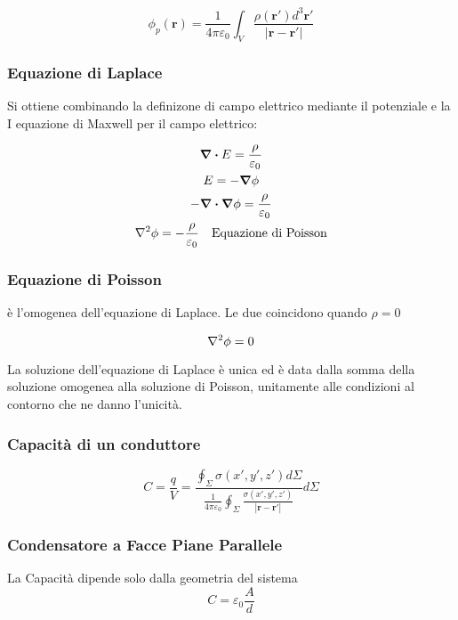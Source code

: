 \documentclass[a4paper]{scrarticle}
\begin{document}
\begin{equation}
    \phi_p(\bm r) = \frac{1}{4\pi\varepsilon_0}\int_{V}\frac{\rho(\bm r') d^3\bm r'}{\left|\bm r - \bm r'\right|}
\end{equation}


\subsubsection*{Equazione di Laplace}

Si ottiene combinando la definizone di campo elettrico mediante il potenziale e la I equazione di Maxwell per il campo elettrico:

\begin{gather*}
    \div E = \frac{\rho}{\varepsilon_0}\\
    E = - \grad \phi\\
    - \div \grad \phi = \frac{\rho}{\varepsilon_0}\\
    \laplacian \phi = -\frac{\rho}{\varepsilon_0} \quad \text{Equazione di Poisson}
\end{gather*}

\subsubsection*{Equazione di Poisson}

è l'omogenea dell'equazione di Laplace. Le due coincidono quando $\rho = 0$

\begin{equation}
    \laplacian \phi = 0
\end{equation}

La soluzione dell'equazione di Laplace è unica ed è data dalla somma della soluzione omogenea alla soluzione di Poisson, unitamente alle condizioni al contorno che ne danno l'unicità.

\subsubsection*{Capacità di un conduttore}

\begin{equation}
    C = \frac{q}{V} = 
    \frac{\oint_\Sigma \sigma (x',y',z') d\Sigma}{\frac{1}{4\pi\varepsilon_0} \oint_\Sigma \frac{\sigma(x',y',z')}{\left| \bm{r} - \bm{r'} \right|}} d\Sigma
\end{equation}

\subsubsection*{Condensatore a Facce Piane Parallele}
La Capacità dipende solo dalla geometria del sistema
\begin{equation*}
    C = \varepsilon_0 \frac{A}{d}
\end{equation*}
\end{document}
